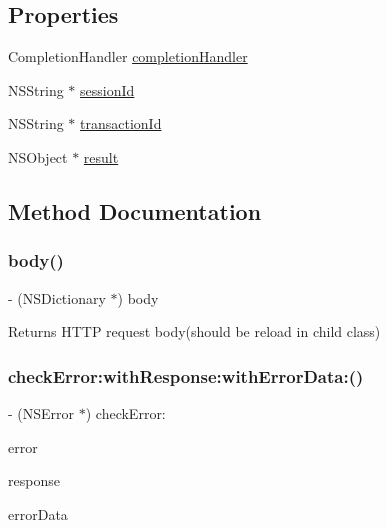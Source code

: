 \subsection*{Properties}
\begin{DoxyCompactItemize}
\item 
Completion\+Handler \hyperlink{interface_s_t_c_networking_manager_a81fe222cb5fce78231d142d1e5c351e1}{completion\+Handler}
\item 
N\+S\+String $\ast$ \hyperlink{interface_s_t_c_networking_manager_a883a3c7d4bb40ab69762c5f640fd1ec0}{session\+Id}
\item 
N\+S\+String $\ast$ \hyperlink{interface_s_t_c_networking_manager_a98ab6e40acba2ec836eaf44f96d41c74}{transaction\+Id}
\item 
N\+S\+Object $\ast$ \hyperlink{interface_s_t_c_networking_manager_a96a61eed2bada8b6f28246be241d4eb5}{result}
\end{DoxyCompactItemize}


\subsection{Method Documentation}
\hypertarget{interface_s_t_c_networking_manager_ac5b20e2356d4fb18337fe7419f8acc3d}{}\label{interface_s_t_c_networking_manager_ac5b20e2356d4fb18337fe7419f8acc3d} 
\subsubsection{\texorpdfstring{body()}{body()}}
{\footnotesize\ttfamily -\/ (N\+S\+Dictionary $\ast$) body \begin{DoxyParamCaption}{ }\end{DoxyParamCaption}}

Returns H\+T\+TP request body(should be reload in child class) \hypertarget{interface_s_t_c_networking_manager_aaabcac801d72fb8859284404965ec580}{}\label{interface_s_t_c_networking_manager_aaabcac801d72fb8859284404965ec580} 
\subsubsection{\texorpdfstring{check\+Error\+:with\+Response\+:with\+Error\+Data\+:()}{checkError:withResponse:withErrorData:()}}
{\footnotesize\ttfamily -\/ (N\+S\+Error $\ast$) check\+Error\+: \begin{DoxyParamCaption}\item[{(N\+S\+Error $\ast$)}]{error }\item[{withResponse:(N\+S\+U\+R\+L\+Response $\ast$)}]{response }\item[{withErrorData:(N\+S\+Data $\ast$)}]{error\+Data }\end{DoxyParamCaption}}

